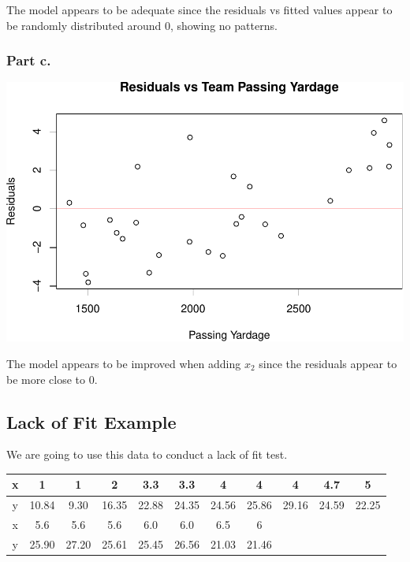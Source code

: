 \documentclass[
  11pt,
]{article}
\newenvironment{Shaded}{\begin{snugshade}}{\end{snugshade}}
\newcommand{\AttributeTok}[1]{\textcolor[rgb]{0.13,0.29,0.53}{#1}}
\newcommand{\DecValTok}[1]{\textcolor[rgb]{0.00,0.00,0.81}{#1}}
\newcommand{\FunctionTok}[1]{\textcolor[rgb]{0.13,0.29,0.53}{\textbf{#1}}}
\newcommand{\NormalTok}[1]{#1}
\newcommand{\OtherTok}[1]{\textcolor[rgb]{0.56,0.35,0.01}{#1}}
\newcommand{\SpecialCharTok}[1]{\textcolor[rgb]{0.81,0.36,0.00}{\textbf{#1}}}
\newcommand{\StringTok}[1]{\textcolor[rgb]{0.31,0.60,0.02}{#1}}
\begin{document}
The model appears to be adequate since the residuals vs fitted values
appear to be randomly distributed around 0, showing no patterns.

\subsubsection{Part c.}\label{part-c.-3}

\begin{Shaded}
\end{Shaded}

\includegraphics[width=0.75\linewidth]{examples_files/figure-latex/unnamed-chunk-22-1}

The model appears to be improved when adding \(x_2\) since the residuals
appear to be more close to 0.

\subsection{Lack of Fit Example}\label{lack-of-fit-example}

We are going to use this data to conduct a lack of fit test.

\begin{center}
  \begin{tabular}{|c|c|c|c|c|c|c|c|c|c|c|}
    \hline
      x & 1 & 1 & 2 & 3.3 & 3.3 & 4 & 4 & 4 & 4.7 & 5\\
      \hline
      y & 10.84 & 9.30 & 16.35 &22.88  &24.35 & 24.56& 25.86 &29.16 &24.59& 22.25\\
      \hline
      x & 5.6 & 5.6 & 5.6 & 6.0 & 6.0 & 6.5 & 6 & & & \\
      \hline
      y & 25.90 & 27.20 & 25.61 & 25.45 & 26.56 & 21.03 & 21.46 & & & \\
    \hline
  \end{tabular}
\end{center}
\end{document}
